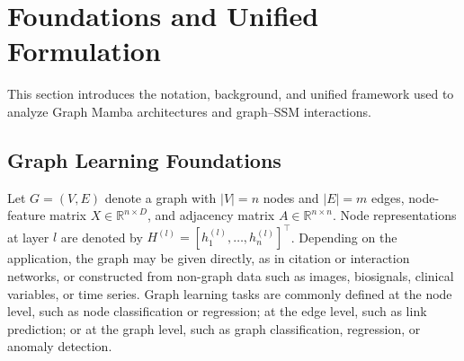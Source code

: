 \documentclass[acmsmall]{acmart}
\begin{document}
\section{Foundations and Unified Formulation}
\label{sec:foundations}

This section introduces the notation, background, and unified framework used to analyze Graph Mamba architectures and graph–SSM interactions.

\subsection{Graph Learning Foundations}
\label{sec:graph-foundations}

Let $G=(V,E)$ denote a graph with $|V|=n$ nodes and $|E|=m$ edges,
node-feature matrix $X\in\mathbb{R}^{n\times D}$, and adjacency matrix
$A\in\mathbb{R}^{n\times n}$. Node representations at layer $l$ are denoted
by $H^{(l)}=[h_1^{(l)},\ldots,h_n^{(l)}]^\top$. Depending on the application,
the graph may be given directly, as in citation or interaction
networks, or constructed from non-graph data such as images, biosignals,
clinical variables, or time series. Graph learning tasks are commonly defined
at the node level, such as node classification or regression; at the edge
level, such as link prediction; or at the graph level, such as graph
classification, regression, or anomaly detection.
\end{document}
